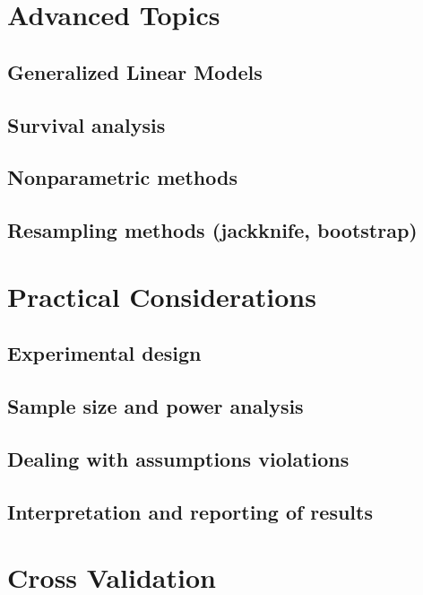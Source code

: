 \documentclass{article}
\begin{document}
\section{Advanced Topics}

  \subsection{Generalized Linear Models}

  \subsection{Survival analysis}

  \subsection{Nonparametric methods}

  \subsection{Resampling methods (jackknife, bootstrap)}

\section{Practical Considerations}

  \subsection{Experimental design}

  \subsection{Sample size and power analysis}

  \subsection{Dealing with assumptions violations}

  \subsection{Interpretation and reporting of results}

\section{Cross Validation} 
\end{document}
